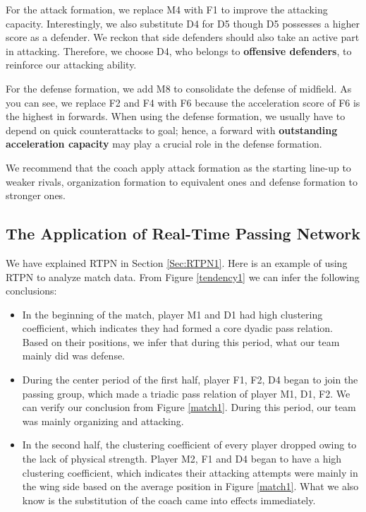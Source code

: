 \documentclass{mcmthesis}
\begin{document}
For the attack formation, we replace M4 with F1 to improve the attacking capacity. Interestingly, we also substitute D4 for D5 though D5 possesses a higher score as a defender. We reckon that side defenders should also take an active part in attacking. Therefore, we choose D4, who belongs to \textbf{offensive defenders}, to reinforce our attacking ability.

For the defense formation, we add M8 to consolidate the defense of midfield. As you can see, we replace F2 and F4 with F6 because the acceleration score of F6 is the highest in forwards. When using the defense formation, we usually have to depend on quick counterattacks to goal; hence, a forward with \textbf{outstanding acceleration capacity} may play a crucial role in the defense formation.

We recommend that the coach apply attack formation as the starting line-up to weaker rivals, organization formation to equivalent ones and defense formation to stronger ones.

\subsection{The Application of Real-Time Passing Network}\label{Sec:RTPNA}
We have explained RTPN in Section \ref{Sec:RTPN1}. Here is an example of using RTPN to analyze match data. From Figure \ref{tendency1} we can infer the following conclusions:

\begin{itemize}
    \item In the beginning of the match, player M1 and D1 had high clustering coefficient, which indicates they had formed a core dyadic pass relation. Based on their positions, we infer that during this period, what our team mainly did was defense.
    \item During the center period of the first half, player F1, F2, D4 began to join the passing group, which made a triadic pass relation of player M1, D1, F2. We can verify our conclusion from Figure \ref{match1}. During this period, our team was mainly organizing and attacking.
    \item In the second half, the clustering coefficient of every player dropped owing to the lack of physical strength. Player M2, F1 and D4 began to have a high clustering coefficient, which indicates their attacking attempts were mainly in the wing side based on the average position in Figure \ref{match1}. What we also know is the substitution of the coach came into effects immediately.
\end{itemize}
\end{document}
